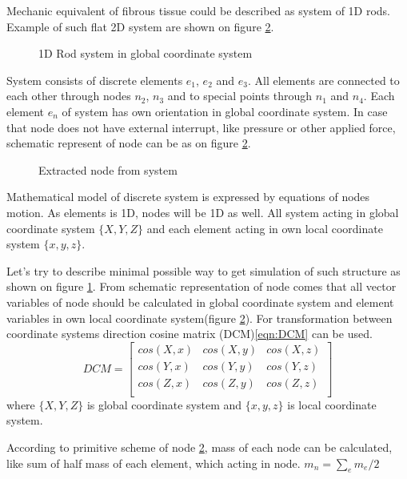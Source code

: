 Mechanic equivalent of fibrous tissue could be described as system of 1D rods.
Example of such flat 2D system are shown on figure \ref{fig:nodeExtract}.
\begin{figure}[H]
  \centering
      
  \caption{1D Rod system in global coordinate system}\label{fig:rodSystem}      
\end{figure} 
System consists of discrete elements $e_1$, $e_2$ and $e_3$. All elements are
connected to each other through nodes $n_2$, $n_3$ and to special points through
$n_1$ and $n_4$. Each element $e_n$ of system has own orientation in global
coordinate system. 
In case that node does not have external interrupt, like pressure or other
 applied force, schematic represent of node can be as on figure
 \ref{fig:nodeExtract}.\par
\begin{figure}[H]
  \centering
      
  \caption{Extracted node from system}\label{fig:nodeExtract}
\end{figure}
Mathematical model of discrete system is expressed by equations of nodes motion.
As elements is 1D, nodes will be 1D as well. All system acting in global
coordinate system $\{X, Y, Z\}$ and each element acting in own local coordinate
system $\{x,y,z\}$.
\par
Let's try to describe minimal possible way to get simulation of such structure
 as shown on figure \ref{fig:rodSystem}. From schematic representation of node
 comes that all vector variables of node should be calculated in global
 coordinate system and element variables in own local coordinate system(figure
 \ref{fig:nodeExtract}). For transformation between coordinate systems direction
 cosine matrix (DCM)\eqref{eqn:DCM} can be used.
\begin{equation}\label{eqn:DCM}
  DCM= \begin{bmatrix}
    cos(X,x)&cos(X,y)&cos(X,z)\\
    cos(Y,x)&cos(Y,y)&cos(Y,z)\\
    cos(Z,x)&cos(Z,y)&cos(Z,z)\\
   \end{bmatrix} 
\end{equation}
where $\{X, Y, Z\}$ is global coordinate system and $\{x,y,z\}$ is local coordinate
system.\par According to primitive scheme of node \ref{fig:nodeExtract}, mass of
each node can be calculated, like sum of half mass of each element, which acting
in node. $m_n=\sum_{e}m_e/2$\par
\newpage